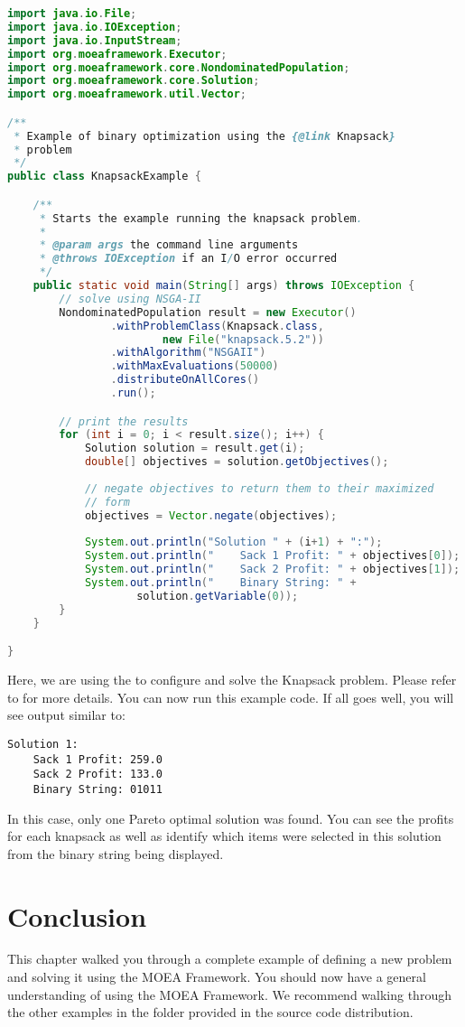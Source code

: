 \begin{lstlisting}[language=Java]
import java.io.File;
import java.io.IOException;
import java.io.InputStream;
import org.moeaframework.Executor;
import org.moeaframework.core.NondominatedPopulation;
import org.moeaframework.core.Solution;
import org.moeaframework.util.Vector;

/**
 * Example of binary optimization using the {@link Knapsack}
 * problem
 */
public class KnapsackExample {

	/**
	 * Starts the example running the knapsack problem.
	 * 
	 * @param args the command line arguments
	 * @throws IOException if an I/O error occurred
	 */
	public static void main(String[] args) throws IOException {			
		// solve using NSGA-II
		NondominatedPopulation result = new Executor()
				.withProblemClass(Knapsack.class,
						new File("knapsack.5.2"))
				.withAlgorithm("NSGAII")
				.withMaxEvaluations(50000)
				.distributeOnAllCores()
				.run();

		// print the results
		for (int i = 0; i < result.size(); i++) {
			Solution solution = result.get(i);
			double[] objectives = solution.getObjectives();
					
			// negate objectives to return them to their maximized
			// form
			objectives = Vector.negate(objectives);
					
			System.out.println("Solution " + (i+1) + ":");
			System.out.println("    Sack 1 Profit: " + objectives[0]);
			System.out.println("    Sack 2 Profit: " + objectives[1]);
			System.out.println("    Binary String: " +
					solution.getVariable(0));
		}
	}

}
\end{lstlisting}

Here, we are using the  to configure and solve the Knapsack problem.  Please refer to  for more details.  You can now run this example code.  If all goes well, you will see output similar to:

\begin{lstlisting}[language=plaintext]
Solution 1:
    Sack 1 Profit: 259.0
    Sack 2 Profit: 133.0
    Binary String: 01011
\end{lstlisting}

In this case, only one Pareto optimal solution was found.  You can see the profits for each knapsack as well as identify which items were selected in this solution from the binary string being displayed.

\section{Conclusion}
This chapter walked you through a complete example of defining a new problem and solving it using the MOEA Framework.  You should now have a general understanding of using the MOEA Framework.  We recommend walking through the other examples in the  folder provided in the source code distribution.